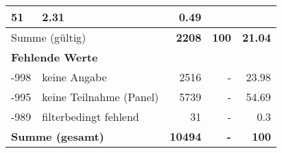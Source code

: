 \begin{longtable}{lXrrr}
       \num{51} &
       \num[round-mode=places,round-precision=2]{2.31} &
         \num[round-mode=places,round-precision=2]{0.49} \\
     \midrule
     \multicolumn{2}{l}{Summe (gültig)} &
       \textbf{\num{2208}} &
     \textbf{\num{100}} &
       \textbf{\num[round-mode=places,round-precision=2]{21.04}} \\
     \multicolumn{5}{l}{\textbf{Fehlende Werte}}\\
       -998 &
       keine Angabe &
         \num{2516} &
        - &
         \num[round-mode=places,round-precision=2]{23.98} \\
       -995 &
       keine Teilnahme (Panel) &
         \num{5739} &
        - &
         \num[round-mode=places,round-precision=2]{54.69} \\
       -989 &
       filterbedingt fehlend &
         \num{31} &
        - &
         \num[round-mode=places,round-precision=2]{0.3} \\
     \midrule
     \multicolumn{2}{l}{\textbf{Summe (gesamt)}} &
          \textbf{\num{10494}} &
        \textbf{-} &
        \textbf{\num{100}} \\
     \bottomrule
     \end{longtable}
     

